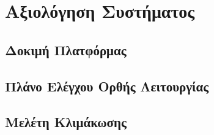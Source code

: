 \chapter{Αξιολόγηση Συστήματος}

\section{Δοκιμή Πλατφόρμας}

\section{Πλάνο Ελέγχου Ορθής Λειτουργίας}

\section{Μελέτη Κλιμάκωσης}

